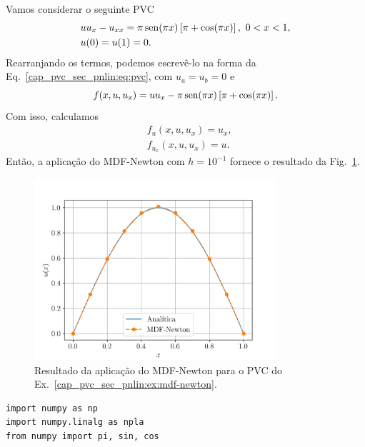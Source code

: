 \begin{ex}\label{cap_pvc_sec_pnlin:ex:mdf-newton}
  Vamos considerar o seguinte PVC
  \begin{subequations}\label{cap_pvc_sec_pnlin:eq:pvc-ex}
    \begin{align}
      &uu_x - u_{xx} = \pi\operatorname{sen}(\pi x)\left[\pi + \cos(\pi x)\right], ~0 < x < 1,\\
      &u(0) = u(1) = 0.
    \end{align}
  \end{subequations}
  Rearranjando os termos, podemos escrevê-lo na forma da Eq.~\eqref{cap_pvc_sec_pnlin:eq:pvc}, com $u_a=u_b=0$ e
  \begin{equation}
    f(x, u, u_x) = uu_x - \pi\operatorname{sen}(\pi x)\left[\pi + \cos(\pi x)\right].
  \end{equation}
  Com isso, calculamos
  \begin{subequations}
    \begin{align}
      &f_u(x, u, u_x) = u_x,\\
      &f_{u_x}(x, u, u_x) = u.
    \end{align}
  \end{subequations}
  Então, a aplicação do MDF-Newton com $h=10^{-1}$ fornece o resultado da Fig.~\ref{cap_pvc_sec_pnlin:fig:mdf-newton}.

  \begin{figure}[H]
    \centering
    \includegraphics[width=0.8\textwidth]{./cap_pvc/dados/fig_mdf-newton/fig}
    \caption{Resultado da aplicação do MDF-Newton para o PVC do Ex.~\ref{cap_pvc_sec_pnlin:ex:mdf-newton}.}
    \label{cap_pvc_sec_pnlin:fig:mdf-newton}
  \end{figure}

\begin{lstlisting}[caption=mdf-newton.py]
import numpy as np
import numpy.linalg as npla
from numpy import pi, sin, cos


\end{lstlisting}
\end{ex}
